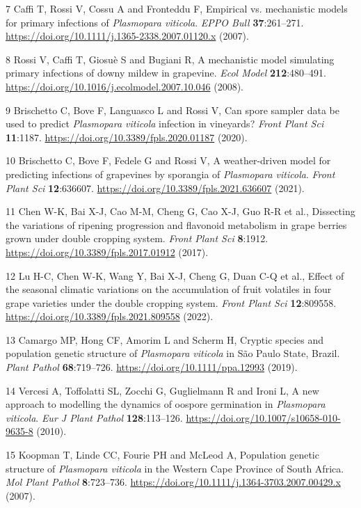 \documentclass{article}
\begin{document}
7 Caffi T, Rossi V, Cossu A and Fronteddu F, Empirical vs. mechanistic models for primary infections of \emph{Plasmopara viticola}. \emph{EPPO Bull} \textbf{37}:261--271. \url{https://doi.org/10.1111/j.1365-2338.2007.01120.x} (2007).

8 Rossi V, Caffi T, Giosuè S and Bugiani R, A mechanistic model simulating primary infections of downy mildew in grapevine. \emph{Ecol Model} \textbf{212}:480--491. \url{https://doi.org/10.1016/j.ecolmodel.2007.10.046} (2008).

9 Brischetto C, Bove F, Languasco L and Rossi V, Can spore sampler data be used to predict \emph{Plasmopara viticola} infection in vineyards? \emph{Front Plant Sci} \textbf{11}:1187. \url{https://doi.org/10.3389/fpls.2020.01187} (2020).

10 Brischetto C, Bove F, Fedele G and Rossi V, A weather-driven model for predicting infections of grapevines by sporangia of \emph{Plasmopara viticola}. \emph{Front Plant Sci} \textbf{12}:636607. \url{https://doi.org/10.3389/fpls.2021.636607} (2021).

11 Chen W-K, Bai X-J, Cao M-M, Cheng G, Cao X-J, Guo R-R et al., Dissecting the variations of ripening progression and flavonoid metabolism in grape berries grown under double cropping system. \emph{Front Plant Sci} \textbf{8}:1912. \url{https://doi.org/10.3389/fpls.2017.01912} (2017).

12 Lu H-C, Chen W-K, Wang Y, Bai X-J, Cheng G, Duan C-Q et al., Effect of the seasonal climatic variations on the accumulation of fruit volatiles in four grape varieties under the double cropping system. \emph{Front Plant Sci} \textbf{12}:809558. \url{https://doi.org/10.3389/fpls.2021.809558} (2022).

13 Camargo MP, Hong CF, Amorim L and Scherm H, Cryptic species and population genetic structure of \emph{Plasmopara viticola} in São Paulo State, Brazil. \emph{Plant Pathol} \textbf{68}:719--726. \url{https://doi.org/10.1111/ppa.12993} (2019).

14 Vercesi A, Toffolatti SL, Zocchi G, Guglielmann R and Ironi L, A new approach to modelling the dynamics of oospore germination in \emph{Plasmopara viticola}. \emph{Eur J Plant Pathol} \textbf{128}:113--126. \url{https://doi.org/10.1007/s10658-010-9635-8} (2010).

15 Koopman T, Linde CC, Fourie PH and McLeod A, Population genetic structure of \emph{Plasmopara viticola} in the Western Cape Province of South Africa. \emph{Mol Plant Pathol} \textbf{8}:723--736. \url{https://doi.org/10.1111/j.1364-3703.2007.00429.x} (2007).
\end{document}
